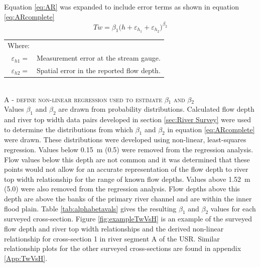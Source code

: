 \begin{linenumbers}
Equation \ref{eq:AR} was expanded to include error terms as shown in equation \ref{eq:ARcomplete}
\begin{equation}
	\label{eq:ARcomplete}
	Tw=\beta_1 \big( h+\varepsilon_{h_1} + \varepsilon_{h_2} \big) ^ {\beta_2}
\end{equation}
\begin{tabular}{r l}
	Where:&\\
	$\varepsilon_{h1}=$& Measurement error at the stream gauge.\\
	$\varepsilon_{h2}=$& Spatial error in the reported flow depth.\\
\end{tabular}\\

\textsc{A - define non-linear regression used to estimate $\beta_1$ and $\beta_2$}\\
Values $\beta_1$ and $\beta_2$ are drawn from probability distributions.  Calculated flow depth and river top width data pairs developed in section \ref{sec:River Survey} were used to determine the distributions from which $\beta_1$ and $\beta_2$ in equation \ref{eq:ARcomplete} were drawn.  These distributions were developed using non-linear, least-squares regression.  Values below \SI{0.15}{\meter} (\SI{0.5}{\foot}) were removed from the regression analysis.  Flow values below this depth are not common and it was determined that these points would not allow for an accurate representation of the flow depth to river top width relationship for the range of known flow depths.  Values above \SI{1.52}{\meter} (\SI{5.0}{\foot}) were also removed from the regression analysis.  Flow depths above this depth are above the banks of the primary river channel and are within the inner flood plain.  Table \ref{tab:alphabetavals} gives the resulting $\beta_1$ and $\beta_2$ values for each surveyed cross-section.  Figure \ref{fig:exampleTwVsH} is an example of the surveyed flow depth and river top width relationships and the derived non-linear relationship for cross-section 1 in river segment A of the USR.  Similar relationship plots for the other surveyed cross-sections are found in appendix \ref{App:TwVsH}.  


\end{linenumbers}

